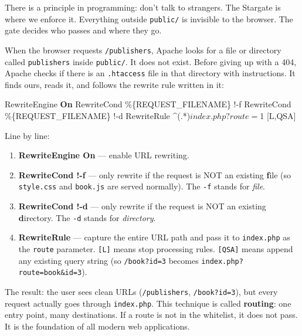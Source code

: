 \documentclass[11pt,a4paper,oneside]{book}
\newenvironment{Shaded}{\begin{snugshade}}{\end{snugshade}}
\newcommand{\KeywordTok}[1]{\textcolor[HTML]{007020}{\textbf{#1}}}
\newcommand{\CharTok}[1]{\textcolor[HTML]{4070A0}{#1}}
\newcommand{\StringTok}[1]{\textcolor[HTML]{4070A0}{#1}}
\newcommand{\ExtensionTok}[1]{#1}
\newcommand{\NormalTok}[1]{#1}
\providecommand{\tightlist}{%
  \setlength{\itemsep}{0pt}\setlength{\parskip}{0pt}}
\begin{document}
There is a principle in programming: don't talk to strangers. The
Stargate is where we enforce it. Everything outside
\texttt{public/} is invisible to the browser. The gate decides
who passes and where they go.

When the browser requests \texttt{/publishers}, Apache looks for
a file or directory called \texttt{publishers} inside
\texttt{public/}. It does not exist. Before giving up with a 404,
Apache checks if there is an \texttt{.htaccess} file in that
directory with instructions. It finds ours, reads it, and follows
the rewrite rule written in it:

\begin{Shaded}
\begin{Highlighting}[]
\ExtensionTok{RewriteEngine}\CharTok{ }\KeywordTok{On}
\NormalTok{RewriteCond}\StringTok{ \%\{REQUEST\_FILENAME\} !{-}f}
\NormalTok{RewriteCond}\StringTok{ \%\{REQUEST\_FILENAME\} !{-}d}
\NormalTok{RewriteRule}\StringTok{ \^{}(.*)$ index.php?route=$1 [L,QSA]}
\end{Highlighting}
\end{Shaded}

Line by line:

\begin{enumerate}
\def\labelenumi{\arabic{enumi}.}
\tightlist
\item
  \textbf{RewriteEngine On} --- enable URL rewriting.
\item
  \textbf{RewriteCond !-f} --- only rewrite if the request is NOT
  an existing \textbf{f}ile (so \texttt{style.css} and
  \texttt{book.js} are served normally). The \texttt{-f} stands
  for \emph{file}.
\item
  \textbf{RewriteCond !-d} --- only rewrite if the request is NOT
  an existing \textbf{d}irectory. The \texttt{-d} stands for
  \emph{directory}.
\item
  \textbf{RewriteRule} --- capture the entire URL path and pass
  it to \texttt{index.php} as the \texttt{route} parameter.
  \texttt{{[}L{]}} means stop processing rules.
  \texttt{{[}QSA{]}} means append any existing query string (so
  \texttt{/book?id=3} becomes
  \texttt{index.php?route=book\&id=3}).
\end{enumerate}

The result: the user sees clean URLs (\texttt{/publishers},
\texttt{/book?id=3}), but every request actually goes through
\texttt{index.php}. This technique is called \textbf{routing}:
one entry point, many destinations. If a route is not in the
whitelist, it does not pass. It is the foundation of all modern
web applications.
\end{document}
